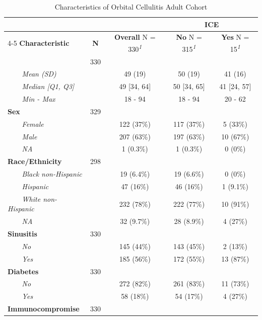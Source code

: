 \documentclass[
]{article}
\begin{document}
\begin{table}[t]
\caption*{
{\fontsize{20}{25}\selectfont  Characteristics of Orbital Cellulitis Adult Cohort\small }
} 
\begin{tabular*}{0.7\linewidth}{@{\extracolsep{\fill}}lcccc}
\toprule
 &  &  & \multicolumn{2}{c}{\textbf{ICE}} \\ 
\cmidrule(lr){4-5}
\textbf{Characteristic} & \textbf{N} & \textbf{Overall}  N = 330\textsuperscript{\textit{1}} & \textbf{No}  N = 315\textsuperscript{\textit{1}} & \textbf{Yes}  N = 15\textsuperscript{\textit{1}} \\ 
\midrule\addlinespace[2.5pt]
{\bfseries Age} & 330 &  &  &  \\ 
{\itshape     Mean (SD)} &  & 49 (19) & 50 (19) & 41 (16) \\ 
{\itshape     Median {[}Q1, Q3{]}} &  & 49 {[}34, 64{]} & 50 {[}34, 65{]} & 41 {[}24, 57{]} \\ 
{\itshape     Min - Max} &  & 18 - 94 & 18 - 94 & 20 - 62 \\ 
{\bfseries Sex} & 329 &  &  &  \\ 
{\itshape     Female} &  & 122 (37\%) & 117 (37\%) & 5 (33\%) \\ 
{\itshape     Male} &  & 207 (63\%) & 197 (63\%) & 10 (67\%) \\ 
{\itshape     NA} &  & 1 (0.3\%) & 1 (0.3\%) & 0 (0\%) \\ 
{\bfseries Race/Ethnicity} & 298 &  &  &  \\ 
{\itshape     Black non-Hispanic} &  & 19 (6.4\%) & 19 (6.6\%) & 0 (0\%) \\ 
{\itshape     Hispanic} &  & 47 (16\%) & 46 (16\%) & 1 (9.1\%) \\ 
{\itshape     White non-Hispanic} &  & 232 (78\%) & 222 (77\%) & 10 (91\%) \\ 
{\itshape     NA} &  & 32 (9.7\%) & 28 (8.9\%) & 4 (27\%) \\ 
{\bfseries Sinusitis} & 330 &  &  &  \\ 
{\itshape     No} &  & 145 (44\%) & 143 (45\%) & 2 (13\%) \\ 
{\itshape     Yes} &  & 185 (56\%) & 172 (55\%) & 13 (87\%) \\ 
{\bfseries Diabetes} & 330 &  &  &  \\ 
{\itshape     No} &  & 272 (82\%) & 261 (83\%) & 11 (73\%) \\ 
{\itshape     Yes} &  & 58 (18\%) & 54 (17\%) & 4 (27\%) \\ 
{\bfseries Immunocompromise} & 330 &  &  &  \\ 

\end{tabular*}
\end{table}
\end{document}
